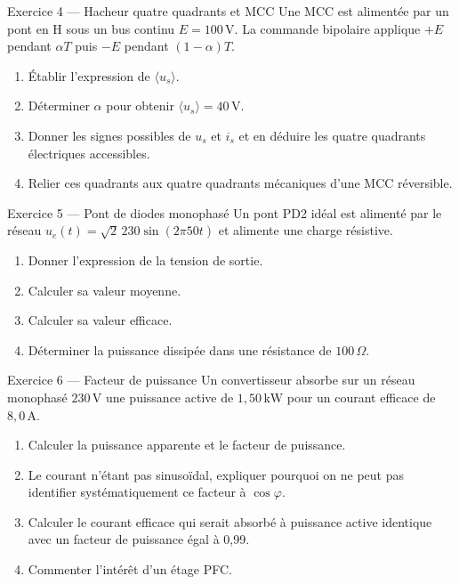 \begin{TLExercise}{Exercice 4 — Hacheur quatre quadrants et MCC}
Une MCC est alimentée par un pont en H sous un bus continu $E=100\,\mathrm V$.
La commande bipolaire applique $+E$ pendant $\alpha T$ puis $-E$ pendant
$(1-\alpha)T$.
\begin{enumerate}
  \item Établir l'expression de $\langle u_s\rangle$.
  \item Déterminer $\alpha$ pour obtenir $\langle u_s\rangle=40\,\mathrm V$.
  \item Donner les signes possibles de $u_s$ et $i_s$ et en déduire les quatre quadrants électriques accessibles.
  \item Relier ces quadrants aux quatre quadrants mécaniques d'une MCC réversible.
\end{enumerate}
\end{TLExercise}

\begin{TLExercise}{Exercice 5 — Pont de diodes monophasé}
Un pont PD2 idéal est alimenté par le réseau
$u_e(t)=\sqrt2\,230\sin(2\pi 50t)$ et alimente une charge résistive.
\begin{enumerate}
  \item Donner l'expression de la tension de sortie.
  \item Calculer sa valeur moyenne.
  \item Calculer sa valeur efficace.
  \item Déterminer la puissance dissipée dans une résistance de $100\,\Omega$.
\end{enumerate}
\end{TLExercise}

\begin{TLExercise}{Exercice 6 — Facteur de puissance}
Un convertisseur absorbe sur un réseau monophasé $230\,\mathrm V$ une puissance
active de $1{,}50\,\mathrm{kW}$ pour un courant efficace de $8{,}0\,\mathrm A$.
\begin{enumerate}
  \item Calculer la puissance apparente et le facteur de puissance.
  \item Le courant n'étant pas sinusoïdal, expliquer pourquoi on ne peut pas identifier systématiquement ce facteur à $\cos\varphi$.
  \item Calculer le courant efficace qui serait absorbé à puissance active identique avec un facteur de puissance égal à 0,99.
  \item Commenter l'intérêt d'un étage PFC.
\end{enumerate}
\end{TLExercise}

